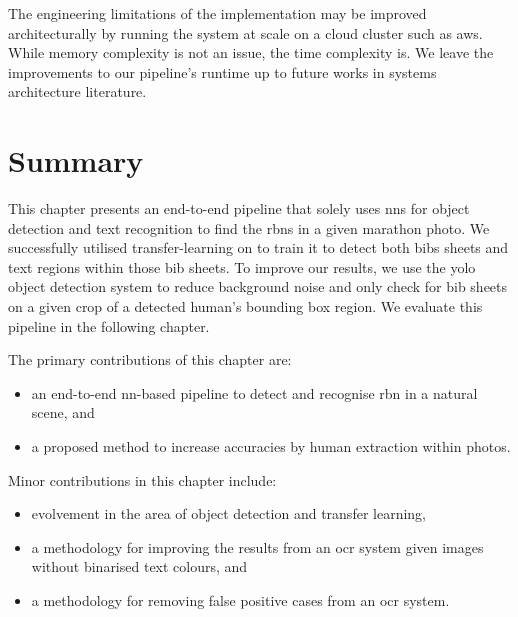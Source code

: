 The engineering limitations of the \frcnn{} implementation may be improved architecturally by running the system at scale on a cloud cluster such as \gls{aws}. While memory complexity is not an issue, the time complexity is. We leave the improvements to our pipeline's runtime up to future works in systems architecture literature.



\section{Summary}

This chapter presents an end-to-end pipeline that solely uses \glspl{nn} for object detection and text recognition to find the \glspl{rbn} in a given marathon photo. We successfully utilised transfer-learning on \frcnn{} to train it to detect both bibs sheets and text regions within those bib sheets. To improve our results, we use the \gls{yolo} object detection system to reduce background noise and only check for bib sheets on a given crop of a detected human's bounding box region. We evaluate this pipeline in the following chapter.

\bigskip

\noindent
The primary contributions of this chapter are:

\begin{itemize}
  \item an end-to-end \gls{nn}-based pipeline to detect and recognise \gls{rbn} in a natural scene, and
  \item a proposed method to increase accuracies by human extraction within photos.
\end{itemize}

\noindent
Minor contributions in this chapter include:

\begin{itemize}
  \item evolvement in the area of object detection and transfer learning,
  \item a methodology for improving the results from an \gls{ocr} system given images without binarised text colours, and
  \item a methodology for removing false positive cases from an \gls{ocr} system.
\end{itemize}


